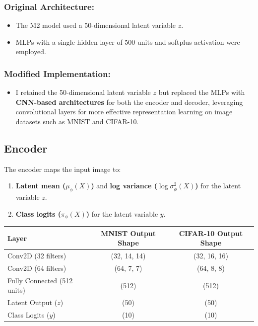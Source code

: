 \documentclass{article}
\begin{document}
\subsubsection*{Original Architecture:}
\begin{itemize}
    \item The M2 model used a 50-dimensional latent variable $z$.
    \item MLPs with a single hidden layer of 500 units and softplus activation were employed.
\end{itemize}

\subsubsection*{Modified Implementation:}
\begin{itemize}
    \item I retained the 50-dimensional latent variable $z$ but replaced the MLPs with \textbf{CNN-based architectures} for both the encoder and decoder, leveraging convolutional layers for more effective representation learning on image datasets such as MNIST and CIFAR-10.
\end{itemize}

\subsection*{Encoder}

The encoder maps the input image to:
\begin{enumerate}
    \item \textbf{Latent mean ($\mu_\phi(X)$)} and \textbf{log variance ($\log \sigma^2_\phi(X)$)} for the latent variable $z$.
    \item \textbf{Class logits ($\pi_\phi(X)$)} for the latent variable $y$.
\end{enumerate}

\begin{center}
\begin{tabular}{|l|c|c|}
\hline
\textbf{Layer} & \textbf{MNIST Output Shape} & \textbf{CIFAR-10 Output Shape} \\
\hline
Conv2D (32 filters) & (32, 14, 14) & (32, 16, 16) \\
Conv2D (64 filters) & (64, 7, 7) & (64, 8, 8) \\
Fully Connected (512 units) & (512) & (512) \\
Latent Output ($z$) & (50) & (50) \\
Class Logits ($y$) & (10) & (10) \\
\hline
\end{tabular}
\end{center}
\end{document}
